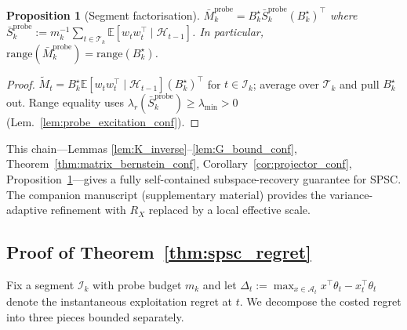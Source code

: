 \documentclass{article}
\newcommand{\E}{\mathbb{E}}
\newcommand{\cA}{\mathcal{A}}
\newcommand{\cH}{\mathcal{H}}
\newcommand{\cT}{\mathcal{T}}
\newcommand{\cI}{\mathcal{I}}
\newcommand{\range}{\mathrm{range}}
\newtheorem{proposition}{Proposition}
\begin{document}
\begin{proposition}[Segment factorisation]
\label{prop:segment_factorization_conf}
$\bar M_k^{\mathrm{probe}} = B_k^\star \bar S_k^{\mathrm{probe}} (B_k^\star)^\top$ where
$\bar S_k^{\mathrm{probe}} := m_k^{-1}\sum_{t\in\cT_k}\E[w_tw_t^\top\mid\cH_{t-1}]$.
In particular, $\range(\bar M_k^{\mathrm{probe}}) = \range(B_k^\star)$.
\end{proposition}
\begin{proof}
$\widetilde M_t = B_k^\star \E[w_tw_t^\top\mid\cH_{t-1}](B_k^\star)^\top$
for $t\in\cI_k$; average over $\cT_k$ and pull $B_k^\star$ out.
Range equality uses
$\lambda_r(\bar S_k^{\mathrm{probe}})\ge\lambda_{\min}>0$
(Lem.~\ref{lem:probe_excitation_conf}).
\end{proof}

This chain---Lemmas \ref{lem:K_inverse}--\ref{lem:G_bound_conf},
Theorem~\ref{thm:matrix_bernstein_conf}, Corollary~\ref{cor:projector_conf},
Proposition~\ref{prop:segment_factorization_conf}---gives a fully
self-contained subspace-recovery guarantee for SPSC. The companion
manuscript (supplementary material) provides the variance-adaptive
refinement with $R_X$ replaced by a local effective scale.

\subsection{Proof of Theorem~\ref{thm:spsc_regret}}
\label{app:proof_main}

Fix a segment $\cI_k$ with probe budget $m_k$ and let
$\Delta_t := \max_{x\in\cA_t} x^\top\theta_t - x_t^\top\theta_t$ denote
the instantaneous exploitation regret at $t$. We decompose the costed
regret into three pieces bounded separately.
\end{document}
